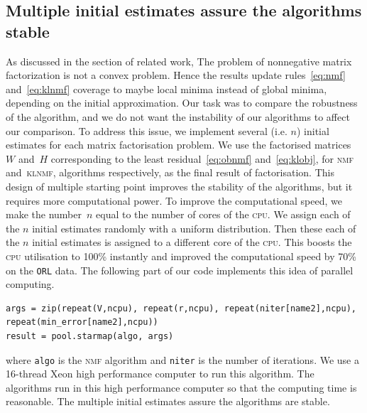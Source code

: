 \subsection{Multiple initial estimates assure the algorithms stable}
As discussed in the section of related work,
The problem of nonnegative matrix factorization is not a convex problem.
Hence the results update rules~\eqref{eq:nmf} and~\eqref{eq:klnmf} coverage to maybe local minima instead of global minima, depending on the initial approximation.
Our task was to compare the robustness of the algorithm, and we do not want the instability of our algorithms to affect our comparison.
To address this issue, we implement several (i.e. $n$) initial estimates for each matrix factorisation problem.
We use the factorised matrices~$W$ and~$H$ corresponding to the least residual~\eqref{eq:obnmf} and~\eqref{eq:klobj}, for \textsc{nmf} and~\textsc{klnmf}, algorithms respectively, as the final result of factorisation.
This design of multiple starting point improves the stability of the algorithms, but it requires more computational power. To improve the computational speed, we make the number~$n$ equal to the number of cores of the \textsc{cpu}. We assign each of the $n$ initial estimates randomly with a uniform distribution. Then these each of the $n$ initial estimates is assigned to a different core of the \textsc{cpu}. This boosts the \textsc{cpu} utilisation to 100\% instantly and improved the computational speed by 70\% on the \texttt{ORL} data. The following part of our code implements this idea of parallel computing.
\begin{lstlisting}[caption=Multi-start paralle computing, label=matn1]
args = zip(repeat(V,ncpu), repeat(r,ncpu), repeat(niter[name2],ncpu), repeat(min_error[name2],ncpu))
result = pool.starmap(algo, args)
\end{lstlisting}
where \texttt{algo} is the \textsc{nmf} algorithm and \texttt{niter} is the number of iterations. We use a 16-thread Xeon high performance computer to run this algorithm.
 The algorithms run in this high performance computer so that the computing time is reasonable.  The multiple initial estimates assure the algorithms are stable.




